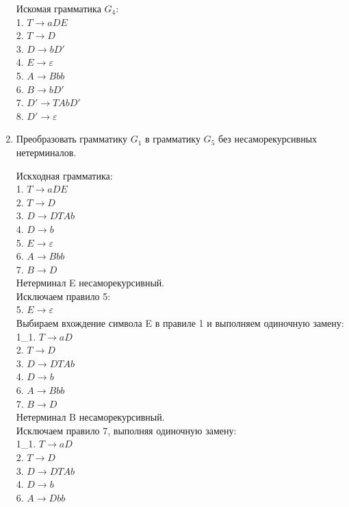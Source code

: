 \documentclass[a4paper,14pt]{extarticle}
\begin{document}
\begin{enumerate}[1.]
Искомая грамматика $G_4$:\\
1. $T \rightarrow aDE$\\
2. $T \rightarrow D$\\
3. $D \rightarrow bD'$\\
4. $E \rightarrow \varepsilon$\\
5. $A \rightarrow Bbb$\\
6. $B \rightarrow bD'$\\
7. $D' \rightarrow TAbD'$\\
8. $D' \rightarrow \varepsilon$\\

\item Преобразовать грамматику $G_1$ в грамматику $G_5$ без несаморекурсивных
нетерминалов.

Искходная грамматика:\\
1. $T \rightarrow aDE$\\
2. $T \rightarrow D$\\
3. $D \rightarrow DTAb$\\
4. $D \rightarrow b$\\
5. $E \rightarrow \varepsilon$\\
6. $A \rightarrow Bbb$\\
7. $B \rightarrow D$\\

Нетерминал E несаморекурсивный.\\
Исключаем правило 5:\\
5. $E \rightarrow \varepsilon$\\
Выбираем вхождение символа E в правиле 1 и
выполняем одиночную замену:\\
1\_1. $T \rightarrow aD$\\
2. $T \rightarrow D$\\
3. $D \rightarrow DTAb$\\
4. $D \rightarrow b$\\
6. $A \rightarrow Bbb$\\
7. $B \rightarrow D$\\

Нетерминал B несаморекурсивный.\\
Исключаем правило 7, выполняя одиночную замену:\\
1\_1. $T \rightarrow aD$\\
2. $T \rightarrow D$\\
3. $D \rightarrow DTAb$\\
4. $D \rightarrow b$\\
6. $A \rightarrow Dbb$\\


\end{enumerate}
\end{document}
